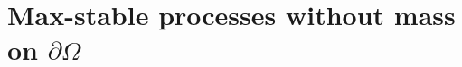 \documentclass[lineno]{biometrika}
\begin{document}
% 

\section{Max-stable processes without mass on $\partial\Omega$} 
\label{sec:theory}
\end{document}
